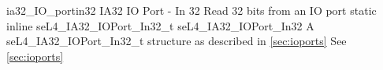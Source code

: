 %
%
%
%

\apidoc
{ia32_IO_portin32}
{IA32 IO Port - In 32}
{Read 32 bits from an IO port}
{static inline seL4\_IA32\_IOPort\_In32\_t seL4\_IA32\_IOPort\_In32}
{
}
{A seL4\_IA32\_IOPort\_In32\_t structure as described in \autoref{sec:ioports}}
{See \autoref{sec:ioports}}
